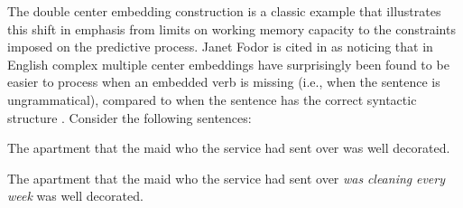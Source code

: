 \documentclass{cambridge7A}\usepackage[]{graphicx}\usepackage[]{color}
\begin{document}
The double center embedding construction is a classic example that
illustrates this shift in emphasis from limits on working memory 
capacity to the constraints imposed on the predictive process.
Janet Fodor is cited in \cite{frazier85} as noticing that in
English complex multiple center embeddings have surprisingly been
found to be easier to process when an embedded verb is missing (i.e.,
when the sentence is ungrammatical), compared to when the sentence has
the correct syntactic structure . Consider the following sentences:

\begin{exe}
\ex \label{ungramCE}
\begin{xlist}
\item *The apartment that the maid who the service had sent over was well decorated.
\item The apartment that the maid who the service had sent over \textit{was} \textit{cleaning} \textit{every} \textit{week} was well decorated.
\end{xlist}
\end{exe}
\end{document}
